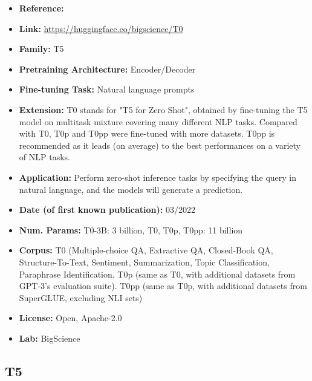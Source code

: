 \documentclass{article}
\begin{document}
            \begin{itemize}
                \item \textbf{Reference:} \href{https://arxiv.org/abs/2110.08207}{}
                \item \textbf{Link:} \url{https://huggingface.co/bigscience/T0}
                \item \textbf{Family:} T5
                \item \textbf{Pretraining Architecture:} Encoder/Decoder
                \item \textbf{Fine-tuning Task:} Natural language prompts
                \item \textbf{Extension:} T0 stands for "T5 for Zero Shot", obtained by fine-tuning the T5 model on multitask mixture covering many different NLP tasks. Compared with T0, T0p and T0pp were fine-tuned with more datasets. T0pp is recommended as it leads (on average) to the best performances on a variety of NLP tasks.
                \item \textbf{Application:} Perform zero-shot inference tasks by specifying the query in natural language, and the models will generate a prediction.
                \item \textbf{Date (of first known publication):} 03/2022
                \item \textbf{Num. Params:} T0-3B: 3 billion, T0, T0p, T0pp: 11 billion
                \item \textbf{Corpus:} T0 (Multiple-choice QA, Extractive QA, Closed-Book QA, Structure-To-Text, Sentiment, Summarization, Topic Classification, Paraphrase Identification. T0p (same as T0, with additional datasets from GPT-3's evaluation suite). T0pp (same as T0p, with additional datasets from SuperGLUE, excluding NLI sets)
                \item \textbf{License:} Open, Apache-2.0
                \item \textbf{Lab:} BigScience
            \end{itemize}
            
\subsection{T5}
\end{document}
